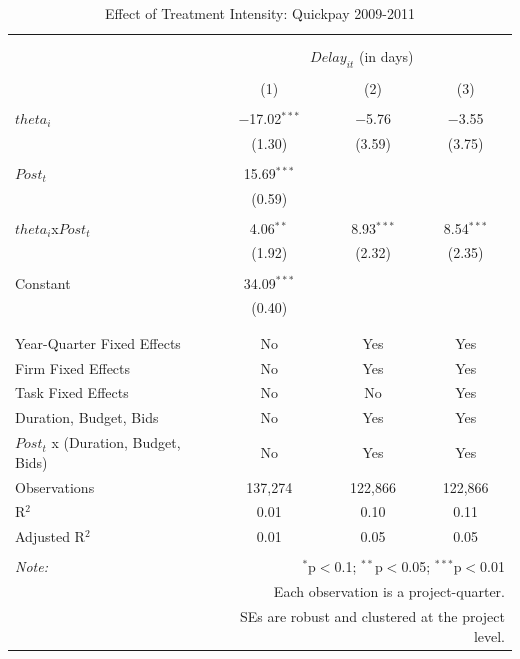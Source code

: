 \documentclass[
]{article}
\begin{document}
\begin{table}[H] \centering 
  \caption{Effect of Treatment Intensity: Quickpay 2009-2011} 
  \label{} 
\small 
\begin{tabular}{@{\extracolsep{-2pt}}lccc} 
\\[-1.8ex]\hline 
\hline \\[-1.8ex] 
\\[-1.8ex] & \multicolumn{3}{c}{$Delay_{it}$ (in days)} \\ 
\\[-1.8ex] & (1) & (2) & (3)\\ 
\hline \\[-1.8ex] 
 $theta_i$ & $-$17.02$^{***}$ & $-$5.76 & $-$3.55 \\ 
  & (1.30) & (3.59) & (3.75) \\ 
  & & & \\ 
 $Post_t$ & 15.69$^{***}$ &  &  \\ 
  & (0.59) &  &  \\ 
  & & & \\ 
 $theta_i$x$Post_t$ & 4.06$^{**}$ & 8.93$^{***}$ & 8.54$^{***}$ \\ 
  & (1.92) & (2.32) & (2.35) \\ 
  & & & \\ 
 Constant & 34.09$^{***}$ &  &  \\ 
  & (0.40) &  &  \\ 
  & & & \\ 
\hline \\[-1.8ex] 
Year-Quarter Fixed Effects & No & Yes & Yes \\ 
Firm Fixed Effects & No & Yes & Yes \\ 
Task Fixed Effects & No & No & Yes \\ 
Duration, Budget, Bids & No & Yes & Yes \\ 
$Post_t$  x  (Duration, Budget, Bids) & No & Yes & Yes \\ 
Observations & 137,274 & 122,866 & 122,866 \\ 
R$^{2}$ & 0.01 & 0.10 & 0.11 \\ 
Adjusted R$^{2}$ & 0.01 & 0.05 & 0.05 \\ 
\hline 
\hline \\[-1.8ex] 
\textit{Note:}  & \multicolumn{3}{r}{$^{*}$p$<$0.1; $^{**}$p$<$0.05; $^{***}$p$<$0.01} \\ 
 & \multicolumn{3}{r}{Each observation is a project-quarter.} \\ 
 & \multicolumn{3}{r}{SEs are robust and clustered at the project level.} \\ 
\end{tabular} 
\end{table}
\end{document}
